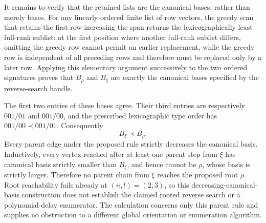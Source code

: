 It remains to verify that the retained lists are the canonical bases, rather than merely bases. For any linearly ordered finite list of row vectors, the greedy scan that retains the first row increasing the span returns the lexicographically least full-rank sublist: at the first position where another full-rank sublist differs, omitting the greedy row cannot permit an earlier replacement, while the greedy row is independent of all preceding rows and therefore must be replaced only by a later row. Applying this elementary argument successively to the two ordered signatures proves that \(B_{\rho}\) and \(B_{\xi}\) are exactly the canonical bases specified by the reverse-search handle.

The first two entries of these bases agree. Their third entries are respectively \(001/01\) and \(001/00\), and the prescribed lexicographic type order has \(001/00\prec001/01\). Consequently
\[B_{\xi}\prec B_{\rho}.\]
Every parent edge under the proposed rule strictly decreases the canonical basis. Inductively, every vertex reached after at least one parent step from \(\xi\) has canonical basis strictly smaller than \(B_{\xi}\), and hence cannot be \(\rho\), whose basis is strictly larger. Therefore no parent chain from \(\xi\) reaches the proposed root \(\rho\). Root reachability fails already at \((n,l)=(2,3)\), so this decreasing-canonical-basis construction does not establish the claimed rooted reverse search or a polynomial-delay enumerator. The calculation concerns only this parent rule and supplies no obstruction to a different global orientation or enumeration algorithm.